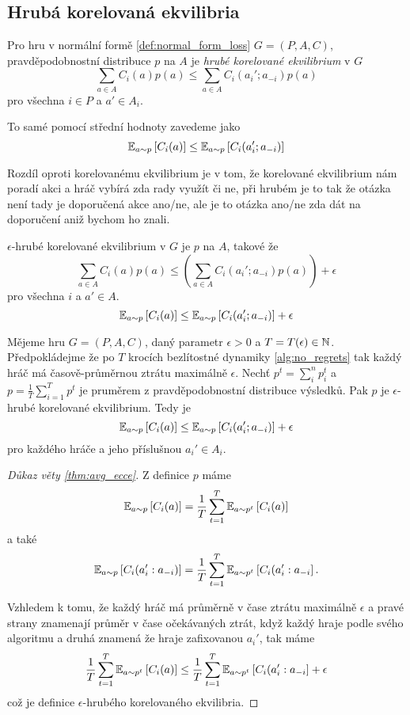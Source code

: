 \subsection{Hrubá korelovaná ekvilibria}
\begin{definition}
\label{def:cce}
Pro hru v normální formě \ref{def:normal_form_loss} $G= (P,A,C)$, pravděpodobnostní distribuce $p$ na $A$ je \textit{hrubé korelované ekvilibrium} v $G$ 
\[
    \sum_{a \in A} C_i(a)p(a) \leq \sum_{a \in A} C_i(a_i';a_{-i}) p(a)
\]
pro všechna $i \in P$ a $a'\in A_i$. 

To samé pomocí střední hodnoty zavedeme jako 
\[
    \E[a \sim p]{C_i(a)} \leq \E[a\sim p]{C_i(a_i';a_{-i})}
\]
\end{definition}
Rozdíl oproti korelovanému ekvilibrium je v tom, že korelované ekvilibrium nám poradí akci a hráč vybírá zda rady využít či ne, při hrubém je to tak že otázka není tady je doporučená akce ano/ne, ale je to otázka ano/ne zda dát na doporučení aniž bychom ho znali. 

\begin{definition}
\label{def:e_cce}
$\epsilon$-hrubé korelované ekvilibrium v $G$ je $p$ na $A$, takové že 
\[
    \sum_{a \in A} C_i(a)p(a) \leq \left( \sum_{a \in A} C_i(a_i';a_{-i}) p(a) \right) + \epsilon 
\]
pro všechna $i$ a $a' \in A$. 
\[
    \E[a \sim p]{C_i(a)} \leq \E[a\sim p]{C_i(a_i';a_{-i})} + \epsilon
\]
\end{definition}

\begin{theorem}\label{thm:avg_ecce}
Mějeme hru $G=(P,A,C)$, daný parametr $\epsilon > 0$ a $T = T(\epsilon) \in \N$. Předpokládejme že po $T$ krocích bezlítostné dynamiky \ref{alg:no_regrets} tak každý hráč má časově-průměrnou ztrátu maximálně $\epsilon$. 
Nechť $p^t =\sum_i^n p^t_i$ a $p = \frac{1}{T} \sum^T_{i=1} p^t$ je pruměrem z pravděpodobnostní distribuce výsledků. Pak $p$ je $\epsilon$-hrubé korelované ekvilibrium. Tedy je  
\[
    \E[a \sim p]{C_i(a)} \leq \E[a\sim p]{C_i(a_i';a_{-i})} + \epsilon
\]
pro každého hráče a jeho příslušnou $a_i' \in A_i$.
\end{theorem}
\begin{proof}[Důkaz věty \ref{thm:avg_ecce}]
    Z definice $p$ máme 
    \[
        \E[a \sim p]{C_i(a)} = \frac{1}{T} \sum^T_{t=1} \E[a\sim p^t]{C_i(a)}
    \]
    a také
    \[
        \E[a \sim p]{C_i(a_i':a_{-i})} = \frac{1}{T} \sum^T_{t=1} \E[a\sim p^t]{C_i(a_i':a_{-i}}.
    \]

    Vzhledem k tomu, že každý hráč má průměrně v čase ztrátu maximálně $\epsilon$ a pravé strany znamenají průměr v čase očekávaných ztrát, když každý hraje podle svého algoritmu a druhá znamená že hraje zafixovanou $a_i'$, tak máme 
    \[
         \frac{1}{T} \sum^T_{t=1} \E[a\sim p^t]{C_i(a)} \leq \frac{1}{T} \sum^T_{t=1} \E[a\sim p^t]{C_i(a_i':a_{-i}} + \epsilon  
    \]
    což je definice $\epsilon$-hrubého korelovaného ekvilibria. 
\end{proof}
